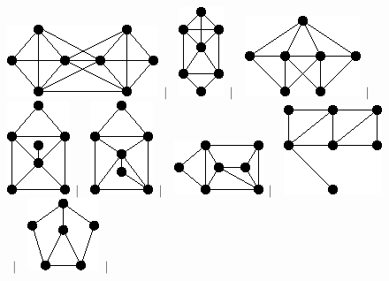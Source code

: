 \documentclass[11pt,paper=b5,footinclude,headinclude]{scrbook} %
\newtheorem{ex}{Vaja\hypertarget{sol:\theex}}[chapter]
\begin{document}
\begin{ex}
\begin{figure}
\includegraphics[scale=0.5]{smallGraphs/g_co-X29.png}$\,\mid\,$\
\includegraphics[scale=0.5]{smallGraphs/g_co-X3.png}$\,\mid\,$\
\includegraphics[scale=0.5]{smallGraphs/g_co-X30.png}$\,\mid\,$\
\includegraphics[scale=0.5]{smallGraphs/g_co-X31.png}$\,\mid\,$\
\includegraphics[scale=0.5]{smallGraphs/g_co-X32.png}$\,\mid\,$\
\includegraphics[scale=0.5]{smallGraphs/g_co-X33.png}$\,\mid\,$\
\includegraphics[scale=0.5]{smallGraphs/g_co-X34.png}$\,\mid\,$\
\includegraphics[scale=0.5]{smallGraphs/g_co-X37.png}$\,\mid\,$\

\end{figure}
\end{ex}
\end{document}
